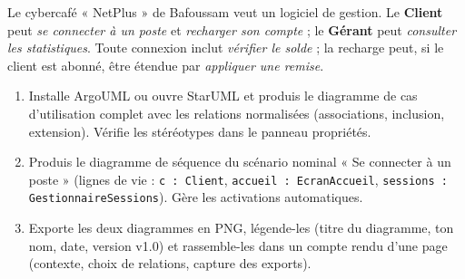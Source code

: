 \documentclass[11pt]{article}
\begin{document}
\begin{exercice}
Le cybercafé « NetPlus » de Bafoussam veut un logiciel de gestion. Le \textbf{Client} peut \emph{se connecter à un poste} et \emph{recharger son compte} ; le \textbf{Gérant} peut \emph{consulter les statistiques}. Toute connexion inclut \emph{vérifier le solde} ; la recharge peut, si le client est abonné, être étendue par \emph{appliquer une remise}.
\begin{enumerate}
\item Installe ArgoUML ou ouvre StarUML et produis le diagramme de cas d'utilisation complet avec les relations normalisées (associations, inclusion, extension). Vérifie les stéréotypes dans le panneau propriétés.
\item Produis le diagramme de séquence du scénario nominal « Se connecter à un poste » (lignes de vie : \texttt{c : Client}, \texttt{accueil : EcranAccueil}, \texttt{sessions : GestionnaireSessions}). Gère les activations automatiques.
\item Exporte les deux diagrammes en PNG, légende-les (titre du diagramme, ton nom, date, version v1.0) et rassemble-les dans un compte rendu d'une page (contexte, choix de relations, capture des exports).
\end{enumerate}
\end{exercice}
\end{document}
